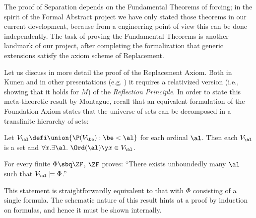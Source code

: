 The proof of Separation depends on the Fundamental Theorems of
forcing; in the spirit of the Formal Abstract project we have only
stated those theorems in our current development, because from a
engineering point of view this can be done independently. The task of
proving the Fundamental Theorems is another landmark of our project,
after completing the formalization that generic extensions satisfy
the axiom scheme of Replacement.



Let us discuss in more detail the proof of the Replacement Axiom. Both
in Kunen and in other presentations (e.g. \cite{neeman-course}) it
requires a relativized version (i.e., showing that it holds for $M$)
of the \emph{Reflection Principle}. In order to state this
meta-theoretic result by Montague, recall that an equivalent
formulation of the Foundation Axiom states that the universe of sets
can be decomposed in a transfinite hierarchy of sets:
\begin{theorem}
  Let $V_{\al}\defi\union\{\P(V_\be) : \be<\al\}$ for each ordinal
  $\al$. Then each $V_\al$ is a set and 
  $\forall x. \exists\al .\ \Ord(\al) \y x\in V_\al$.  
\end{theorem}
\begin{theorem}\label{th:reflection-principle}
  For every finite $\Phi\sbq\ZF$, $\ZF$ proves: ``There exists
  unboundedly many $\al$ such that $V_\al\models \Phi$.''
\end{theorem}

This statement is straightforwardly equivalent to that with $\Phi$
consisting of a single formula. The schematic nature of this result
hints at a proof by induction on formulas, and hence it must be shown
internally. 

